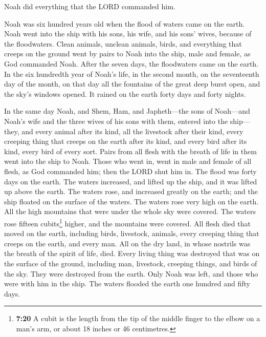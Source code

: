  Noah did everything that the LORD commanded him.

 Noah was six hundred years old when the flood of waters
came on the earth.  Noah went into the ship with his sons,
his wife, and his sons' wives, because of the floodwaters.
 Clean animals, unclean animals, birds, and everything
that creeps on the ground  went by pairs to Noah into the
ship, male and female, as God commanded Noah.  After the
seven days, the floodwaters came on the earth.  In the
six hundredth year of Noah's life, in the second month, on the
seventeenth day of the month, on that day all the fountains of the great
deep burst open, and the sky's windows opened.  It rained
on the earth forty days and forty nights.

 In the same day Noah, and Shem, Ham, and Japheth---the
sons of Noah---and Noah's wife and the three wives of his sons with
them, entered into the ship---  they, and every animal
after its kind, all the livestock after their kind, every creeping thing
that creeps on the earth after its kind, and every bird after its kind,
every bird of every sort.  Pairs from all flesh with the
breath of life in them went into the ship to Noah.  Those
who went in, went in male and female of all flesh, as God commanded him;
then the LORD shut him in.  The flood was forty days on
the earth. The waters increased, and lifted up the ship, and it was
lifted up above the earth.  The waters rose, and
increased greatly on the earth; and the ship floated on the surface of
the waters.  The waters rose very high on the earth. All
the high mountains that were under the whole sky were covered.
 The waters rose fifteen cubits\footnote{\textbf{7:20} A
  cubit is the length from the tip of the middle finger to the elbow on
  a man's arm, or about 18 inches or 46 centimetres.} higher, and the
mountains were covered.  All flesh died that moved on the
earth, including birds, livestock, animals, every creeping thing that
creeps on the earth, and every man.  All on the dry land,
in whose nostrils was the breath of the spirit of life, died.
 Every living thing was destroyed that was on the surface
of the ground, including man, livestock, creeping things, and birds of
the sky. They were destroyed from the earth. Only Noah was left, and
those who were with him in the ship.  The waters flooded
the earth one hundred and fifty days.

